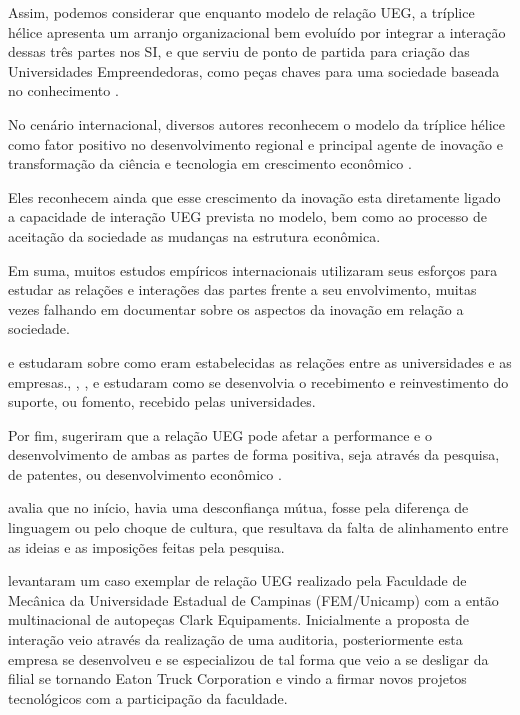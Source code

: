 Assim, podemos considerar que enquanto modelo de relação UEG, a tríplice hélice apresenta um arranjo organizacional bem evoluído por integrar a interação dessas três partes nos SI, e que serviu de ponto de partida para criação das Universidades Empreendedoras, como peças chaves para uma sociedade baseada no conhecimento \cite{etzkowitz2004evolution, etzkowitz2005innovating}.

No cenário internacional, diversos autores reconhecem o modelo da tríplice hélice como fator positivo no desenvolvimento regional e principal agente de inovação e transformação da ciência e tecnologia em crescimento econômico \cite{etzkowitz1998norms, etzkowitz2000dynamics, etzkowitz2007regional}.

Eles reconhecem ainda que esse crescimento da inovação esta diretamente ligado a capacidade de interação UEG prevista no modelo, bem como ao processo de aceitação da sociedade as mudanças na estrutura econômica.

Em suma, muitos estudos empíricos internacionais utilizaram seus esforços para estudar as relações e interações das partes frente a seu envolvimento, muitas vezes falhando em documentar sobre os aspectos da inovação em relação a sociedade.

 e  estudaram sobre como eram estabelecidas as relações entre as universidades e as empresas., , ,  e  estudaram como se desenvolvia o recebimento e reinvestimento do suporte, ou fomento, recebido pelas universidades.

Por fim, sugeriram que a relação UEG pode afetar a performance e o desenvolvimento de ambas as partes de forma positiva, seja através da pesquisa, de patentes, ou desenvolvimento econômico \cite{landry2006some, mueller2006exploring, shane2004academic}.

 avalia que no início, havia uma desconfiança mútua, fosse pela diferença de linguagem ou pelo choque de cultura, que resultava da falta de alinhamento entre as ideias e as imposições feitas pela pesquisa.

 levantaram um caso exemplar de relação UEG realizado pela Faculdade de Mecânica da Universidade Estadual de Campinas (FEM/Unicamp) com a então multinacional de autopeças Clark Equipaments. Inicialmente a proposta de interação veio através da realização de uma auditoria, posteriormente esta empresa se desenvolveu e se especializou de tal forma que veio a se desligar da filial se tornando Eaton Truck Corporation e vindo a firmar novos projetos tecnológicos com a participação da faculdade.

